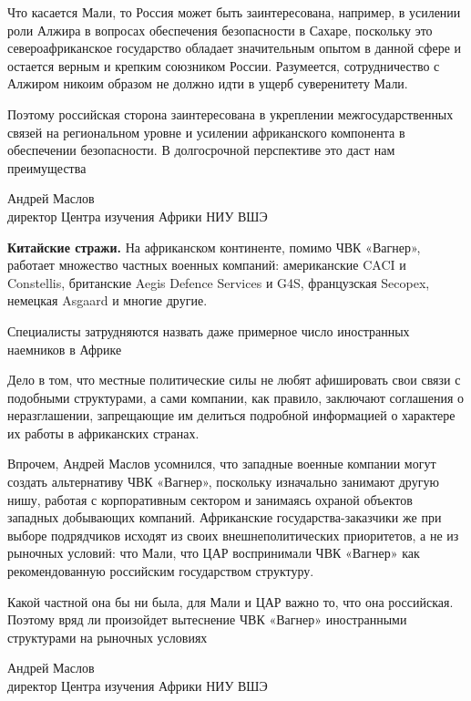 Что касается Мали, то Россия может быть заинтересована, например, в усилении роли Алжира в вопросах обеспечения безопасности в Сахаре, поскольку это североафриканское государство обладает значительным опытом в данной сфере и остается верным и крепким союзником России. Разумеется, сотрудничество с Алжиром никоим образом не должно идти в ущерб суверенитету Мали.

\begin{fancyquotes}
    Поэтому российская сторона заинтересована в укреплении межгосударственных связей на региональном уровне и усилении африканского компонента в обеспечении безопасности. В долгосрочной перспективе это даст нам преимущества

    \begin{flushright}
        Андрей Маслов\\
        директор Центра изучения Африки НИУ ВШЭ
    \end{flushright}

\end{fancyquotes}

\textbf{Китайские стражи.} На африканском континенте, помимо ЧВК «Вагнер», работает множество частных военных компаний: американские CACI и Constellis, британские Aegis Defence Services и G4S, французская Secopex, немецкая Asgaard и многие другие.

\begin{center}
    \Large
    Специалисты затрудняются назвать даже примерное число иностранных наемников в Африке
\end{center}

Дело в том, что местные политические силы не любят афишировать свои связи с подобными структурами, а сами компании, как правило, заключают соглашения о неразглашении, запрещающие им делиться подробной информацией о характере их работы в африканских странах.

Впрочем, Андрей Маслов усомнился, что западные военные компании могут создать альтернативу ЧВК «Вагнер», поскольку изначально занимают другую нишу, работая с корпоративным сектором и занимаясь охраной объектов западных добывающих компаний. Африканские государства-заказчики же при выборе подрядчиков исходят из своих внешнеполитических приоритетов, а не из рыночных условий: что Мали, что ЦАР воспринимали ЧВК «Вагнер» как рекомендованную российским государством структуру.

\begin{fancyquotes}
    Какой частной она бы ни была, для Мали и ЦАР важно то, что она российская. Поэтому вряд ли произойдет вытеснение ЧВК «Вагнер» иностранными структурами на рыночных условиях


    \begin{flushright}
        Андрей Маслов\\
        директор Центра изучения Африки НИУ ВШЭ
    \end{flushright}

\end{fancyquotes}


